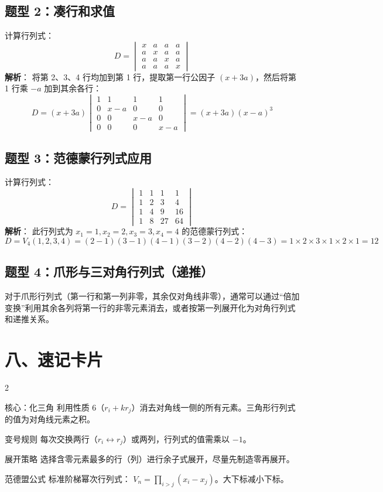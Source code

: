 \documentclass{ctexart}
\begin{document}
\subsection{题型 2：凑行和求值}
计算行列式：
\[
D = \begin{vmatrix} x & a & a & a \\ a & x & a & a \\ a & a & x & a \\ a & a & a & x \end{vmatrix}
\]
\textbf{解析}：
将第 2、3、4 行均加到第 1 行，提取第一行公因子 $(x+3a)$，然后将第 1 行乘 $-a$ 加到其余各行：
\[
D = (x+3a) \begin{vmatrix} 1 & 1 & 1 & 1 \\ 0 & x-a & 0 & 0 \\ 0 & 0 & x-a & 0 \\ 0 & 0 & 0 & x-a \end{vmatrix} = (x+3a)(x-a)^3
\]

\subsection{题型 3：范德蒙行列式应用}
计算行列式：
\[
D = \begin{vmatrix} 1 & 1 & 1 & 1 \\ 1 & 2 & 3 & 4 \\ 1 & 4 & 9 & 16 \\ 1 & 8 & 27 & 64 \end{vmatrix}
\]
\textbf{解析}：
此行列式为 $x_1=1, x_2=2, x_3=3, x_4=4$ 的范德蒙行列式：
\[
D = V_4(1, 2, 3, 4) = (2-1)(3-1)(4-1)(3-2)(4-2)(4-3) = 1 \times 2 \times 3 \times 1 \times 2 \times 1 = 12
\]

\subsection{题型 4：爪形与三对角行列式（递推）}
对于爪形行列式（第一行和第一列非零，其余仅对角线非零），通常可以通过``倍加变换''利用其余各列将第一行的非零元素消去，或者按第一列展开化为对角行列式和递推关系。

\section{八、速记卡片}

\begin{multicols}{2}
\begin{cardbox}{核心：化三角}
  利用性质 6（$r_i + kr_j$）消去对角线一侧的所有元素。三角形行列式的值为对角线元素之积。
\end{cardbox}

\begin{cardbox}{变号规则}
  每次交换两行（$r_i \leftrightarrow r_j$）或两列，行列式的值需乘以 $-1$。
\end{cardbox}

\begin{cardbox}{展开策略}
  选择含零元素最多的行（列）进行余子式展开，尽量先制造零再展开。
\end{cardbox}

\begin{cardbox}{范德盟公式}
  标准阶梯幂次行列式：
  $V_n = \prod_{i>j}(x_i-x_j)$。大下标减小下标。
\end{cardbox}
\end{multicols}
\end{document}

